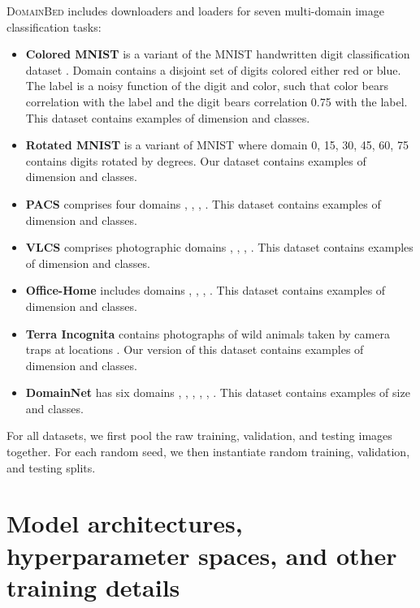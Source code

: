 \documentclass{article}
\newcommand{\domainbed}{\textsc{DomainBed}\xspace}
\begin{document}
\domainbed includes downloaders and loaders for seven multi-domain image classification tasks: 

\begin{itemize}
    \item \textbf{Colored MNIST} \citep{arjovsky2019invariant} is a variant of the MNIST handwritten digit classification dataset \citep{lecun1998mnist}. Domain  contains a disjoint set of digits colored either red or blue. The label is a noisy function of the digit and color, such that color bears correlation  with the label and the digit bears correlation 0.75 with the label. This dataset contains  examples of dimension  and  classes.
\item \textbf{Rotated MNIST} \citep{ghifary2015domain} is a variant of MNIST where domain  0, 15, 30, 45, 60, 75  contains digits rotated by  degrees. Our dataset contains  examples of dimension  and  classes.
\item \textbf{PACS} \citep{Li_2017_ICCV} comprises four domains  , , ,  . This dataset contains  examples of dimension  and  classes.
\item \textbf{VLCS} \citep{fang2013unbiased} comprises photographic domains  , , ,  . This dataset contains  examples of dimension  and  classes.
\item \textbf{Office-Home} \citep{venkateswara2017Deep} includes domains  , , ,  . This dataset contains  examples of dimension  and  classes.
\item \textbf{Terra Incognita} \citep{beery2018recognition} contains photographs of wild animals taken by camera traps at locations . Our version of this dataset contains  examples of dimension  and  classes.
\item \textbf{DomainNet} \citep{peng2019moment} has six domains  , , , , ,  . This dataset contains  examples of size  and  classes.
\end{itemize}

For all datasets, we first pool the raw training, validation, and testing images together.
For each random seed, we then instantiate random training, validation, and testing splits.

\clearpage
\newpage
\section{Model architectures, hyperparameter spaces, and other training details}
\label{sec:architectures}
\end{document}

